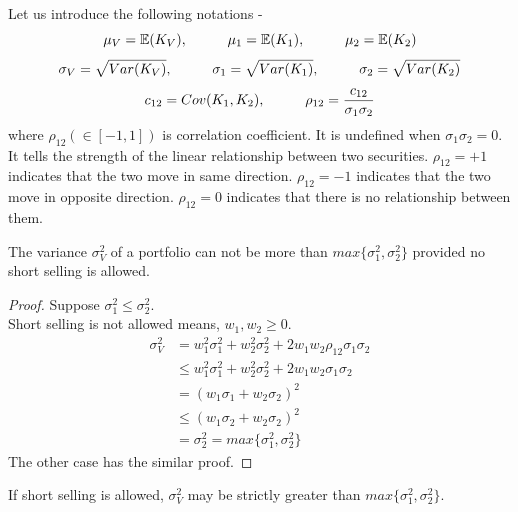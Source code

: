 Let us introduce the following notations -\\
    $$\mu_{V}=\mathbb{E}(K_{V}), \hspace{10mm} \mu_{1}=\mathbb{E}(K_{1}), \hspace{10mm} \mu_{2}=\mathbb{E}(K_{2})$$
    $$\sigma_{V}=\sqrt{Var(K_{V})}, \hspace{10mm} \sigma_{1}=\sqrt{Var(K_{1})}, \hspace{10mm} \sigma_{2}=\sqrt{Var(K_{2})}$$
    $$c_{12}=Cov(K_{1},K_{2}), \hspace{10mm} \rho_{12}=\frac{c_{12}}{\sigma_{1}\sigma_{2}}$$
 where $\rho_{12} (\in [-1,1])$ is correlation coefficient. It is undefined when $\sigma_{1}\sigma_{2}=0.$ It tells the strength of the linear relationship between two securities. $\rho_{12}=+1$ indicates that the two move in same direction. $\rho_{12}=-1$ indicates that the two move in opposite direction. $\rho_{12}=0$ indicates that there is no relationship between them.
\begin{theorem}
The variance $\sigma_{V}^{2}$ of a portfolio can not be more than $max\{\sigma_{1}^{2},\sigma_{2}^{2}\}$ provided no short selling is allowed.
\end{theorem} 
\begin{proof}
    Suppose $\sigma_{1}^{2} \leq \sigma_{2}^{2}$. 
    \\Short selling is not allowed means, $w_{1},w_{2}\geq 0.$
    \begin{align*}
        \sigma_{V}^{2} &= w_{1}^2\sigma_{1}^{2}+w_{2}^2\sigma_{2}^{2}+2w_{1}w_{2}\rho_{12}\sigma_{1}\sigma_{2}\\
        & \leq w_{1}^2\sigma_{1}^{2}+w_{2}^2\sigma_{2}^{2}+2w_{1}w_{2}\sigma_{1}\sigma_{2}\\
        & = (w_{1}\sigma_{1} + w_{2}\sigma_{2})^{2}\\
        & \leq (w_{1}\sigma_{2} + w_{2}\sigma_{2})^{2}\\
        & = \sigma_{2}^{2} = max\{\sigma_{1}^{2},\sigma_{2}^{2}\}
    \end{align*}
    The other case has the similar proof.
\end{proof}
\begin{remark}
If short selling is allowed,  $\sigma_{V}^{2}$ may be strictly greater than $max\{\sigma_{1}^{2},\sigma_{2}^{2}\}$.
\end{remark}

